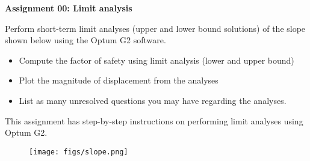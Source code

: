 \documentclass[a4paper,12pt]{article}
\begin{document}
\begin{centering}
	\textbf{
		Assignment 00: Limit analysis\\
	}
\end{centering}

\vspace{1em}
 
Perform short-term limit analyses (upper and lower bound solutions) of the slope shown below using the Optum G2 software. 

\begin{itemize}
	\item Compute the factor of safety using limit analysis (lower and upper bound)
	\item Plot the magnitude of displacement from the analyses
	\item List as many unresolved questions you may have regarding the analyses.
\end{itemize}

This assignment has step-by-step instructions on performing limit analyses using Optum G2.

\begin{figure}[!h]
	\centering
	\texttt{[image: figs/slope.png]}
\end{figure}
\end{document}
